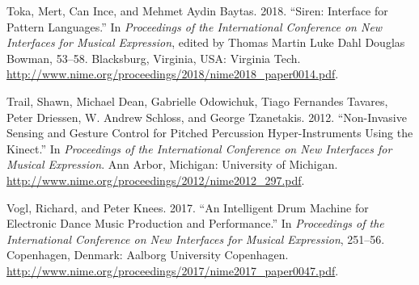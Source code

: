 \documentclass[
]{article}
\newlength{\cslhangindent}
\newenvironment{cslreferences}%
  {\setlength{\parindent}{0pt}%
  \everypar{\setlength{\hangindent}{\cslhangindent}}\ignorespaces}%
  {\par}
\begin{document}
\begin{cslreferences}
\leavevmode\hypertarget{ref-Toka2018}{}%
Toka, Mert, Can Ince, and Mehmet Aydin Baytas. 2018. ``Siren: Interface
for Pattern Languages.'' In \emph{Proceedings of the International
Conference on New Interfaces for Musical Expression}, edited by Thomas
Martin Luke Dahl Douglas Bowman, 53--58. Blacksburg, Virginia, USA:
Virginia Tech.
\url{http://www.nime.org/proceedings/2018/nime2018_paper0014.pdf}.

\leavevmode\hypertarget{ref-Trail:2012a}{}%
Trail, Shawn, Michael Dean, Gabrielle Odowichuk, Tiago Fernandes
Tavares, Peter Driessen, W. Andrew Schloss, and George Tzanetakis. 2012.
``Non-Invasive Sensing and Gesture Control for Pitched Percussion
Hyper-Instruments Using the Kinect.'' In \emph{Proceedings of the
International Conference on New Interfaces for Musical Expression}. Ann
Arbor, Michigan: University of Michigan.
\url{http://www.nime.org/proceedings/2012/nime2012_297.pdf}.

\leavevmode\hypertarget{ref-rvogl2017}{}%
Vogl, Richard, and Peter Knees. 2017. ``An Intelligent Drum Machine for
Electronic Dance Music Production and Performance.'' In
\emph{Proceedings of the International Conference on New Interfaces for
Musical Expression}, 251--56. Copenhagen, Denmark: Aalborg University
Copenhagen.
\url{http://www.nime.org/proceedings/2017/nime2017_paper0047.pdf}.
\end{cslreferences}
\end{document}
